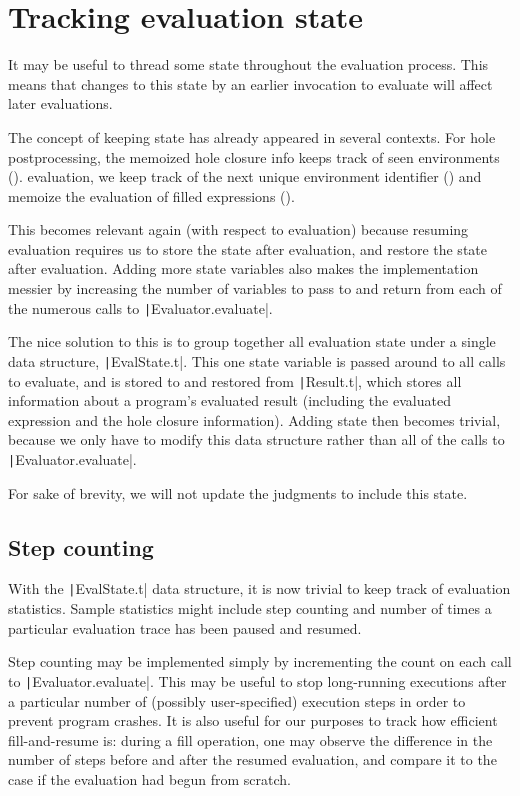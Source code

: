 \section{Tracking evaluation state}
\label{sec:eval-state}

It may be useful to thread some state throughout the evaluation process. This means that changes to this state by an earlier invocation to evaluate will affect later evaluations.

The concept of keeping state has already appeared in several contexts. For hole postprocessing, the memoized hole closure info keeps track of seen environments (). evaluation, we keep track of the next unique environment identifier () and memoize the evaluation of filled expressions ().

This becomes relevant again (with respect to evaluation) because resuming evaluation requires us to store the state after evaluation, and restore the state after evaluation. Adding more state variables also makes the implementation messier by increasing the number of variables to pass to and return from each of the numerous calls to \texttt|Evaluator.evaluate|.

The nice solution to this is to group together all evaluation state under a single data structure, \texttt|EvalState.t|. This one state variable is passed around to all calls to evaluate, and is stored to and restored from \texttt|Result.t|, which stores all information about a program's evaluated result (including the evaluated expression and the hole closure information). Adding state then becomes trivial, because we only have to modify this data structure rather than all of the calls to \texttt|Evaluator.evaluate|.

For sake of brevity, we will not update the judgments to include this state.

\subsection{Step counting}
\label{sec:step-counting}

With the \texttt|EvalState.t| data structure, it is now trivial to keep track of evaluation statistics. Sample statistics might include step counting and number of times a particular evaluation trace has been paused and resumed.

Step counting may be implemented simply by incrementing the count on each call to \texttt|Evaluator.evaluate|. This may be useful to stop long-running executions after a particular number of (possibly user-specified) execution steps in order to prevent program crashes. It is also useful for our purposes to track how efficient fill-and-resume is: during a fill operation, one may observe the difference in the number of steps before and after the resumed evaluation, and compare it to the case if the evaluation had begun from scratch.

